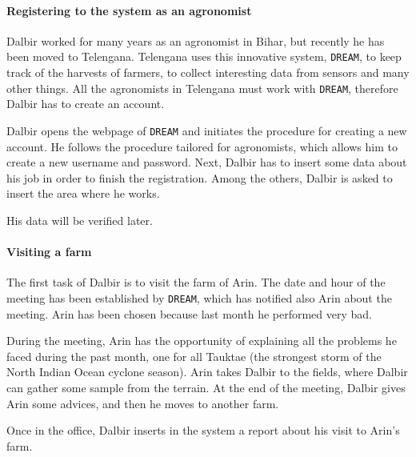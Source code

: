 \documentclass{article}
\begin{document}
\paragraph{Registering to the system as an agronomist}
Dalbir worked for many years as an agronomist in Bihar, but recently he has been moved to Telengana. Telengana uses this innovative system, \verb|DREAM|, to keep track of the harvests of farmers, to collect interesting data from sensors and many other things. All the agronomists in Telengana must work with \verb|DREAM|, therefore Dalbir has to create an account. \par
\noindent Dalbir opens the webpage of \verb|DREAM| and initiates the procedure for creating a new account. He follows the procedure tailored for agronomists, which allows him to create a new username and password. Next, Dalbir has to insert some data about his job in order to finish the registration. Among the others, Dalbir is asked to insert the area where he works.\par
\noindent His data will be verified later.
\paragraph{Visiting a farm}
The first task of Dalbir is to visit the farm of Arin. The date and hour of the meeting has been established by \verb |DREAM|, which has notified also Arin about the meeting. Arin has been chosen because last month he performed very bad.\par
\noindent During the meeting, Arin has the opportunity of explaining all the problems he faced during the past month, one for all Tauktae (the strongest storm of the North Indian Ocean cyclone season). Arin takes Dalbir to the fields, where Dalbir can gather some sample from the terrain. At the end of the meeting, Dalbir gives Arin some advices, and then he moves to another farm. \par
\noindent Once in the office, Dalbir inserts in the system a report about his visit to Arin's farm.
\end{document}
